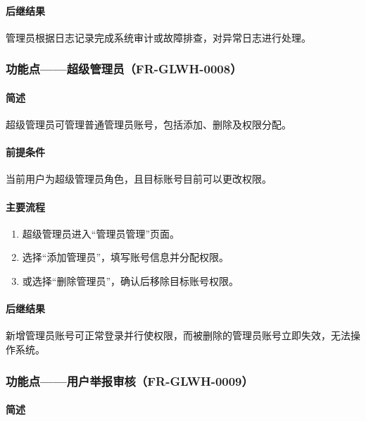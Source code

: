 {\paragraph*{后继结果}

管理员根据日志记录完成系统审计或故障排查，对异常日志进行处理。

\subsubsection{功能点——超级管理员（FR-GLWH-0008）}

\paragraph*{简述}

超级管理员可管理普通管理员账号，包括添加、删除及权限分配。

\paragraph*{前提条件}

当前用户为超级管理员角色，且目标账号目前可以更改权限。

\paragraph*{主要流程}

\begin{enumerate}
    \item 超级管理员进入“管理员管理”页面。
    \item 选择“添加管理员”，填写账号信息并分配权限。
    \item 或选择“删除管理员”，确认后移除目标账号权限。
\end{enumerate}

\paragraph*{后继结果}

新增管理员账号可正常登录并行使权限，而被删除的管理员账号立即失效，无法操作系统。

\subsubsection{功能点——用户举报审核（FR-GLWH-0009）}

\paragraph*{简述}

}
